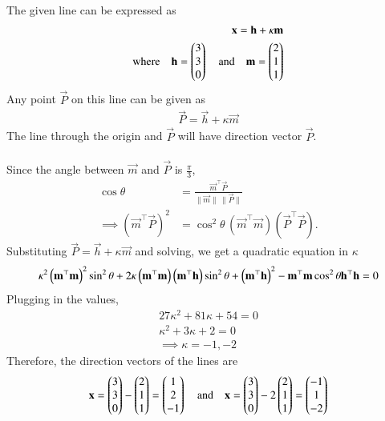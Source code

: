 \documentclass[journal]{IEEEtran}
\begin{document}
\solution \\
The given line can be expressed as
\begin{align}
    \mathbf{x} = \mathbf{h} + \kappa\mathbf{m}\\
    \text{where}\quad \mathbf{h} = \begin{pmatrix}3\\3\\0\end{pmatrix}\quad \text{and} \quad\mathbf{m} = \begin{pmatrix}2\\1\\1\end{pmatrix}
\end{align}
Any point $\vec{P}$ on this line can be given as 
\begin{align}
    \vec{P} = \vec{h} + \kappa\vec{m}
\end{align}
The line through the origin and $\vec{P}$ will have direction vector $\vec{P}$.\\\\
Since the angle between $\vec{m}$ and $\vec{P}$ is $\tfrac{\pi}{3}$,
\begin{align}
\cos \theta &= \frac{\vec{m}^\top \vec{P}}{\|\vec{m}\| \,\|\vec{P}\|} \\
\implies \left( \vec{m}^\top \vec{P} \right)^2 &= \cos^2\theta\,(\vec{m}^\top\vec{m})(\vec{P}^\top\vec{P}).
\end{align}
Substituting $\vec{P} = \vec{h} + \kappa\vec{m}$ and solving, we get a quadratic equation in $\kappa$
\begin{align}
    \kappa^2\left(\mathbf{m}^\top\mathbf{m}\right)^2\sin^2\theta + 2\kappa\left(\mathbf{m}^\top\mathbf{m}\right)\left(\mathbf{m}^\top\mathbf{h}\right)\sin^2\theta + \left(\mathbf{m}^\top\mathbf{h}\right)^2 - \mathbf{m}^\top\mathbf{m}\cos^2\theta\mathbf{h}^\top\mathbf{h} = 0
\end{align}
Plugging in the values,
\begin{align}
    27\kappa^2 + 81\kappa + 54 = 0\\
    \kappa^2 + 3\kappa + 2 =0\\
    \implies \kappa = -1,-2
\end{align}
Therefore, the direction vectors of the lines are
\begin{align}
    \mathbf{x} = \begin{pmatrix}3\\3\\0\end{pmatrix}-\begin{pmatrix}2\\1\\1\end{pmatrix}=\begin{pmatrix}1\\2\\-1\end{pmatrix} \quad \text{and} \quad \mathbf{x} = \begin{pmatrix}3\\3\\0\end{pmatrix}-2\begin{pmatrix}2\\1\\1\end{pmatrix}=\begin{pmatrix}-1\\1\\-2\end{pmatrix}
\end{align}
\end{document}
